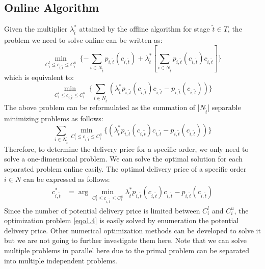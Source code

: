 \documentclass[sigconf,authordraft]{acmart}
\begin{document}
\subsection{Online Algorithm}
Given the multiplier $\lambda^*_{\tilde{t}}$ attained by the offline algorithm for stage $\tilde{t}\in T$, the problem we need to solve online can be written as:
\begin{equation}
   \label{eqo1.1} \min_{C_i^l\le c_{i,\tilde{t}}\le C_i^u} ~\{-\sum_{i\in N_{\tilde{t}}} p_{i,\tilde{t}}(c_{i,\tilde{t}})+\lambda^*_{\tilde{t}} [\sum_{i\in N_{\tilde{t}}}p_{i,\tilde{t}}(c_{i,\tilde{t}})c_{i,\tilde{t}}]\}
\end{equation}
which is equivalent to:
\begin{equation}
   \label{eqo1.2} \min_{C_i^l\le c_{i,\tilde{t}}\le C_i^u} ~\{\sum_{i\in N_{\tilde{t}}} (\lambda^*_{\tilde{t}}p_{i,\tilde{t}}(c_{i,\tilde{t}})c_{i,\tilde{t}}-p_{i,\tilde{t}}(c_{i,\tilde{t}}))\}
\end{equation}
The above problem can be reformulated as the summation of |$N_{\tilde{t}}$| separable minimizing problems as follows:
\begin{equation}
   \label{eqo1.3} \sum_{i\in N_{\tilde{t}}} \min_{C_i^l\le c_{i,\tilde{t}}\le C_i^u}\{ (\lambda^*_{\tilde{t}}p_{i,\tilde{t}}(c_{i,\tilde{t}})c_{i,\tilde{t}}-p_{i,\tilde{t}}(c_{i,\tilde{t}}))\}
\end{equation}
Therefore, to determine the delivery price for a specific order, we only need to solve a one-dimensional problem. We can solve the optimal solution for each separated problem online easily. The optimal delivery price of a specific order $i\in N$ can be expressed as follows:
\begin{equation}
\begin{aligned}
    \label{eqo1.4}c^*_{i,\tilde{t}}&= \arg \min_{C_i^l\le c_{i,\tilde{t}}\le C_i^u} \lambda^*_{\tilde{t}}p_{i,\tilde{t}}(c_{i,\tilde{t}})c_{i,\tilde{t}}-p_{i,\tilde{t}}(c_{i,\tilde{t}})
\end{aligned}
\end{equation}
Since the number of potential delivery price is limited between $C_i^l$ and $C_i^u$, the optimization problem \eqref{eqo1.4} is easily solved by enumeration the potential delivery price. Other numerical optimization methods can be developed to solve it but we are not going to further investigate them here. Note that we can solve multiple problems in parallel here due to the primal problem can be separated into multiple independent problems.
\end{document}

